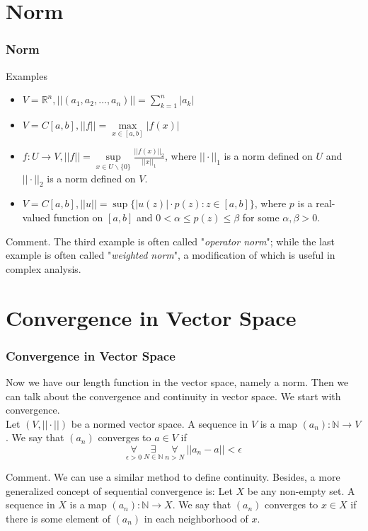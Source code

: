 \documentclass[12pt, t]{beamer}
\renewcommand{\emph}[1]{{\color{Turquoise3}\textsl{#1}}}
\begin{document}
\section{Norm}
\begin{frame}
    \frametitle{Norm}
Examples\\

\begin{itemize}
    \item $V=\mathbb{R}^n, ||(a_1,a_2,\dots,a_n)||=\sum^{n}_{k=1}|a_k|$
    \item $V=C[a,b], ||f||=\underset{x\in[a,b]}{\max}|f(x)|$
    \item $f:U\rightarrow V, ||f||=\underset{x\in U\backslash\{0\}}{\sup}\frac{||f(x)||_2}{||x||_1}$, where $||\cdot||_1$ is a norm defined on $U$ and $||\cdot||_2$ is a norm defined on $V$.
    \item $V=C[a,b], ||u||=\sup\{|u(z)|\cdot p(z):z\in[a,b]\}$, where $p$ is a real-valued function on $[a,b]$ and $0<\alpha\leq p(z)\leq \beta $ for some $\alpha,\beta>0$.
\end{itemize}

\vspace{1em}
Comment. The third example is often called "\emph{operator norm}"; while the last example is often called "\emph{weighted norm}", a modification of which is useful in complex analysis.
    
\end{frame}

\section{Convergence in Vector Space}
\begin{frame}
    \frametitle{Convergence in Vector Space}
Now we have our length function in the vector space, namely a norm. Then we can talk about the convergence and continuity in vector space. We start with convergence.\\
\vspace{1em}
\hspace{1em}
Let $(V,||\cdot||)$ be a normed vector space. A sequence in $V$ is a map $(a_n):\mathbb{N}\rightarrow V$. We say that $(a_n)$ converges to $a\in V$ if 
\begin{equation*}
    \underset{\epsilon>0}{\forall}\ \underset{N\in\mathbb{N}}{\exists}\ \underset{n>N}{\forall}\ ||a_n-a||<\epsilon
\end{equation*}

\vspace{1em}
Comment. We can use a similar method to define continuity. Besides, a more generalized concept of sequential convergence is: Let $X$ be any non-empty set. 
A sequence in $X$ is a map $(a_n):\mathbb{N}\rightarrow X$. We say that $(a_n)$  converges to $x\in X$ if there is some element of $(a_n)$ in each neighborhood of $x$.

\end{frame}
\end{document}
